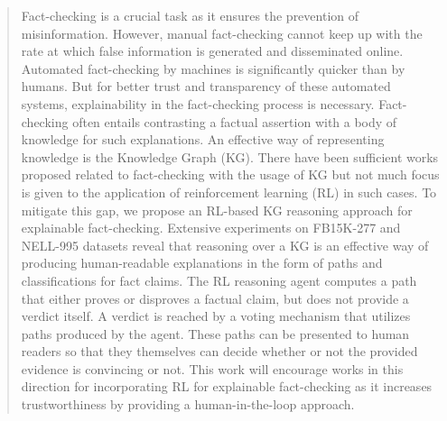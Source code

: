 \documentclass[conference]{IEEEtran}
\newcommand{\fixme}[1]{{\textcolor{blue}{\em\bf{[FIXME: #1]}}}}
\begin{document}
\begin{abstract}
Fact-checking is a crucial task as it ensures the prevention of misinformation. However, manual fact-checking cannot keep up with the rate at which false information is generated and disseminated online. Automated fact-checking by machines is significantly quicker than by humans. But for better trust and transparency of these automated systems, explainability in the fact-checking process is necessary. Fact-checking often entails contrasting a factual assertion with a body of knowledge for such explanations. An effective way of representing knowledge is the Knowledge Graph (KG). There have been sufficient works proposed related to fact-checking with the usage of KG but not much focus is given to the application of reinforcement learning (RL) in such cases. To mitigate this gap, we propose an RL-based KG reasoning approach for explainable fact-checking. Extensive experiments on FB15K-277 and NELL-995 datasets reveal that reasoning over a KG is an effective way of producing human-readable explanations in the form of paths and classifications for fact claims. The RL reasoning agent computes a path that either proves or disproves a factual claim, but does not provide a verdict itself. A verdict is reached by a voting mechanism that utilizes paths produced by the agent. These paths can be presented to human readers so that they themselves can decide 
whether or not the provided evidence is convincing or not. This work will encourage works in this direction for incorporating RL for explainable fact-checking as it increases trustworthiness %
by providing a human-in-the-loop approach. %

\end{abstract}
\end{document}
